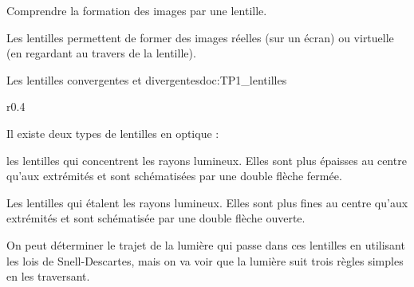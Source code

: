 \tetePremStssVisi
{}

\begin{objectifs}
  \item Comprendre la formation des images par une lentille.
\end{objectifs}

\begin{contexte}
  Les lentilles permettent de former des images réelles (sur un écran) ou virtuelle (en regardant au travers de la lentille).
  
\end{contexte}

\begin{doc}{Les lentilles convergentes et divergentes}{doc:TP1_lentilles}
  \begin{wrapfigure}[10]{r}{0.4\linewidth}
    \centering
    \vspace*{-42pt}
  \end{wrapfigure}
  
  Il existe deux types de lentilles en optique : 
  \begin{listePoints}
      \item les lentilles  qui concentrent les rayons lumineux.
      Elles sont plus épaisses au centre qu'aux extrémités et sont schématisées par une double flèche fermée.
      \item Les lentilles  qui étalent les rayons lumineux.
      Elles sont plus fines au centre qu'aux extrémités et sont schématisée par une double flèche ouverte.
  \end{listePoints}

  On peut déterminer le trajet de la lumière qui passe dans ces lentilles en utilisant les lois de Snell-Descartes, mais on va voir que la lumière suit trois règles simples en les traversant.
\end{doc}

